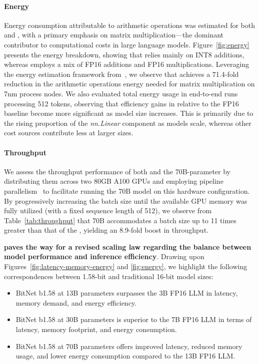\paragraph{Energy}

Energy consumption attributable to arithmetic operations was estimated for both  and , with a primary emphasis on matrix multiplication—the dominant contributor to computational costs in large language models. Figure~\ref{fig:energy} presents the energy breakdown, showing that  relies mainly on INT8 additions, whereas  employs a mix of FP16 additions and FP16 multiplications. Leveraging the energy estimation framework from~\cite{energycost, pokebnn}, we observe that  achieves a 71.4-fold reduction in the arithmetic operations energy needed for matrix multiplication on 7nm process nodes. We also evaluated total energy usage in end-to-end runs processing 512 tokens, observing that efficiency gains in  relative to the FP16  baseline become more significant as model size increases. This is primarily due to the rising proportion of the \emph{nn.Linear} component as models scale, whereas other cost sources contribute less at larger sizes.

\paragraph{Throughput}

We assess the throughput performance of both  and the 70B-parameter  by distributing them across two 80GB A100 GPUs and employing pipeline parallelism~\cite{gpipe} to facilitate running the  70B model on this hardware configuration. By progressively increasing the batch size until the available GPU memory was fully utilized (with a fixed sequence length of 512), we observe from Table~\ref{tab:throughput} that  70B accommodates a batch size up to 11 times greater than that of the , yielding an 8.9-fold boost in throughput.

\textbf{ paves the way for a revised scaling law regarding the balance between model performance and inference efficiency}. Drawing upon Figures~\ref{fig:latency-memory-energy} and \ref{fig:energy}, we highlight the following correspondences between 1.58-bit and traditional 16-bit model sizes:

\begin{itemize}
    \item BitNet b1.58 at 13B parameters surpasses the 3B FP16 LLM in latency, memory demand, and energy efficiency.
    \item BitNet b1.58 at 30B parameters is superior to the 7B FP16 LLM in terms of latency, memory footprint, and energy consumption.
    \item BitNet b1.58 at 70B parameters offers improved latency, reduced memory usage, and lower energy consumption compared to the 13B FP16 LLM.
\end{itemize}

